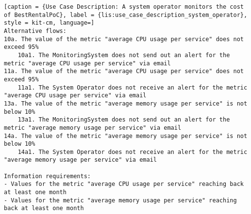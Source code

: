 \begin{lstlisting}[caption = {Use Case Description: A system operator monitors the cost of BestRentalPoC}, label = {lis:use_case_description_system_operator}, style = kit-cm, language=]
Alternative flows:
10a. The value of the metric "average CPU usage per service" does not exceed 95%
	10a1. The MonitoringSystem does not send out an alert for the metric "average CPU usage per service" via email
11a. The value of the metric "average CPU usage per service" does not exceed 95%
	11a1. The System Operator does not receive an alert for the metric "average CPU usage per service" via email
13a. The value of the metric "average memory usage per service" is not below 10%
	13a1. The MonitoringSystem does not send out an alert for the metric "average memory usage per service" via email
14a. The value of the metric "average memory usage per service" is not below 10%
	14a1. The System Operator does not receive an alert for the metric "average memory usage per service" via email

Information requirements:
- Values for the metric "average CPU usage per service" reaching back at least one month
- Values for the metric "average memory usage per service" reaching back at least one month
\end{lstlisting}

